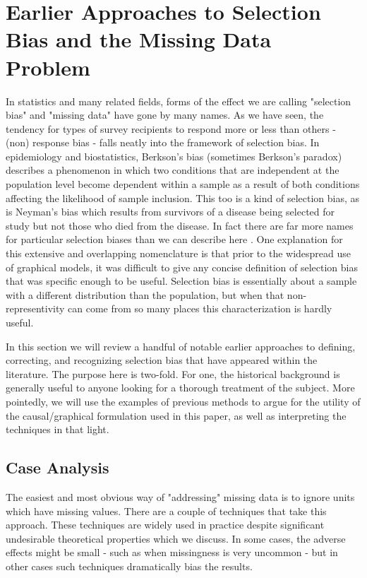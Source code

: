 \documentclass[12pt,twoside]{reedthesis}
\theoremstyle{definition}
\begin{document}
\chapter{Earlier Approaches to Selection Bias and the Missing Data Problem}

In statistics and many related fields, forms of the effect we are calling "selection bias" and "missing data" have gone by many names. As we have seen,  the tendency for types of survey recipients to respond more or less than others - (non) response bias - falls neatly into the framework of selection bias. In epidemiology and biostatistics, Berkson's bias (sometimes Berkson's paradox) describes a phenomenon in which two conditions that are independent at the population level become dependent within a sample as a result of both conditions affecting the likelihood of sample inclusion. This too is a kind of selection bias, as is Neyman's bias which results from survivors of a disease being selected for study but not those who died from the disease. In fact there are far more names for particular selection biases than we can describe here \citep{Delgado_2008}. One explanation for this extensive and overlapping nomenclature is that prior to the widespread use of graphical models, it was difficult to give any concise definition of selection bias that was specific enough to be useful. Selection bias is essentially about a sample with a different distribution than the population, but when that non-representivity can come from so many places this characterization is hardly useful.

In this section we will review a handful of notable earlier approaches to defining, correcting, and recognizing selection bias that have appeared within the literature. The purpose here is two-fold. For one, the historical background is generally useful to anyone looking for a thorough treatment of the subject. More pointedly, we will use the examples of previous methods to argue for the utility of the causal/graphical formulation used in this paper, as well as interpreting the techniques in that light.


\section{Case Analysis}

The easiest and most obvious way of "addressing" missing data is to ignore units which have missing values. There are a couple of techniques that take this approach. These techniques are widely used in practice despite significant undesirable theoretical properties \citep{Little_1986} which we discuss. In some cases, the adverse effects might be small - such as when missingness is very uncommon - but in other cases such techniques dramatically bias the results. 
\end{document}
